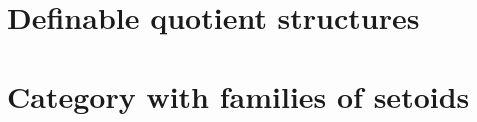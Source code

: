 \documentclass[11pt,a4paper,UKenglish,twoside,openright]{Thesis}
\begin{document}






%



 



%





%



\appendix %




\chapter{Definable quotient structures}



%

\chapter{Category with families of setoids}\label{app:cwf}






\end{document}
